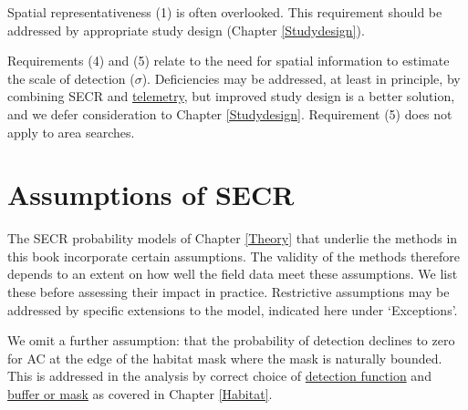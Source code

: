 \documentclass[
]{book}
\begin{document}
Spatial representativeness (1) is often overlooked. This requirement should be addressed by appropriate study design (Chapter \ref{Studydesign}).

Requirements (4) and (5) relate to the need for spatial information to estimate the scale of detection (\(\sigma\)). Deficiencies may be addressed, at least in principle, by combining SECR and \hyperref[Telemetry]{telemetry}, but improved study design is a better solution, and we defer consideration to Chapter \ref{Studydesign}. Requirement (5) does not apply to area searches.

\section{Assumptions of SECR}\label{assumptions}

The SECR probability models of Chapter \ref{Theory} that underlie the methods in this book incorporate certain assumptions. The validity of the methods therefore depends to an extent on how well the field data meet these assumptions. We list these before assessing their impact in practice. Restrictive assumptions may be addressed by specific extensions to the model, indicated here under `Exceptions'.

We omit a further assumption: that the probability of detection declines to zero for AC at the edge of the habitat mask where the mask is naturally bounded. This is addressed in the analysis by correct choice of \hyperref[detectfn]{detection function} and \hyperref[Habitat]{buffer or mask} as covered in Chapter \ref{Habitat}.
\end{document}
